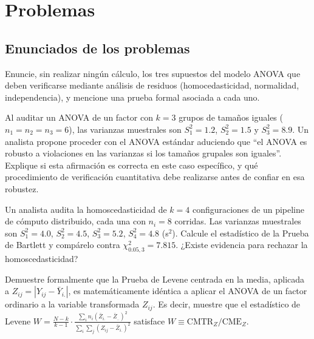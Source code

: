 \section*{Problemas}

\subsection*{Enunciados de los problemas}

\begin{problema}
	\label{prob:aa64893}
	Enuncie, sin realizar ningún cálculo, los tres supuestos del modelo ANOVA que deben verificarse mediante análisis de residuos (homocedasticidad, normalidad, independencia), y mencione una prueba formal asociada a cada uno.
\end{problema}

\begin{problema}
	\label{prob:e34d9fb}
	Al auditar un ANOVA de un factor con $k=3$ grupos de tamaños iguales ($n_1=n_2=n_3=6$), las varianzas muestrales son $S_1^2=1.2$, $S_2^2=1.5$ y $S_3^2=8.9$. Un analista propone proceder con el ANOVA estándar aduciendo que ``el ANOVA es robusto a violaciones en las varianzas si los tamaños grupales son iguales''. Explique si esta afirmación es correcta en este caso específico, y qué procedimiento de verificación cuantitativa debe realizarse antes de confiar en esa robustez.
\end{problema}

\begin{problema}
	\label{prob:57b555d}
	Un analista audita la homoscedasticidad de $k=4$ configuraciones de un pipeline de cómputo distribuido, cada una con $n_i=8$ corridas. Las varianzas muestrales son $S_1^2=4.0$, $S_2^2=4.5$, $S_3^2=5.2$, $S_4^2=4.8$ (s$^2$). Calcule el estadístico de la Prueba de Bartlett y compárelo contra $\chi^2_{0.05,3}=7.815$. ¿Existe evidencia para rechazar la homoscedasticidad?
\end{problema}

\begin{problema}
	\label{prob:e2546e4}
	Demuestre formalmente que la Prueba de Levene centrada en la media, aplicada a $Z_{ij}=|Y_{ij}-\bar Y_{i.}|$, es matemáticamente idéntica a aplicar el ANOVA de un factor ordinario a la variable transformada $Z_{ij}$. Es decir, muestre que el estadístico de Levene $W=\frac{N-k}{k-1}\cdot\frac{\sum_i n_i(\bar Z_{i.}-\bar Z_{..})^2}{\sum_i\sum_j(Z_{ij}-\bar Z_{i.})^2}$ satisface $W\equiv\text{CMTR}_Z/\text{CME}_Z$.
\end{problema}

